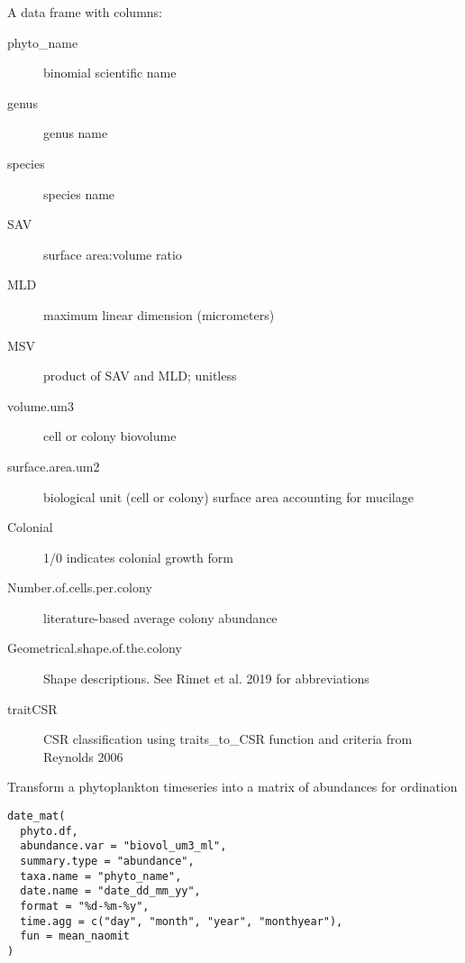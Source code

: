 \documentclass[a4paper]{book}
\begin{document}
\begin{Format}
A data frame with columns:
\begin{description}

\item[phyto\_name] binomial scientific name
\item[genus] genus name
\item[species] species name
\item[SAV] surface area:volume ratio
\item[MLD] maximum linear dimension (micrometers)
\item[MSV] product of SAV and MLD; unitless
\item[volume.um3] cell or colony biovolume
\item[surface.area.um2] biological unit (cell or colony) surface area accounting for mucilage
\item[Colonial] 1/0 indicates colonial growth form
\item[Number.of.cells.per.colony] literature-based average colony abundance
\item[Geometrical.shape.of.the.colony] Shape descriptions. See Rimet et al. 2019 for abbreviations
\item[traitCSR] CSR classification using traits\_to\_CSR function and criteria from Reynolds 2006

\end{description}

\end{Format}
%
\begin{Description}\relax
Transform a phytoplankton timeseries into a matrix of abundances for ordination
\end{Description}
%
\begin{Usage}
\begin{verbatim}
date_mat(
  phyto.df,
  abundance.var = "biovol_um3_ml",
  summary.type = "abundance",
  taxa.name = "phyto_name",
  date.name = "date_dd_mm_yy",
  format = "%d-%m-%y",
  time.agg = c("day", "month", "year", "monthyear"),
  fun = mean_naomit
)
\end{verbatim}
\end{Usage}
%
\end{document}
